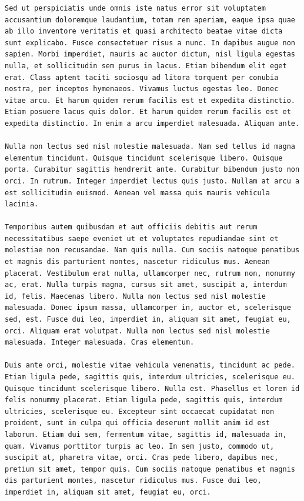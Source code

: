 \documentclass[a4paper, 12pt]{article}
\begin{document}
\begin{verbatim}
Sed ut perspiciatis unde omnis iste natus error sit voluptatem accusantium doloremque laudantium, totam rem aperiam, eaque ipsa quae ab illo inventore veritatis et quasi architecto beatae vitae dicta sunt explicabo. Fusce consectetuer risus a nunc. In dapibus augue non sapien. Morbi imperdiet, mauris ac auctor dictum, nisl ligula egestas nulla, et sollicitudin sem purus in lacus. Etiam bibendum elit eget erat. Class aptent taciti sociosqu ad litora torquent per conubia nostra, per inceptos hymenaeos. Vivamus luctus egestas leo. Donec vitae arcu. Et harum quidem rerum facilis est et expedita distinctio. Etiam posuere lacus quis dolor. Et harum quidem rerum facilis est et expedita distinctio. In enim a arcu imperdiet malesuada. Aliquam ante.

Nulla non lectus sed nisl molestie malesuada. Nam sed tellus id magna elementum tincidunt. Quisque tincidunt scelerisque libero. Quisque porta. Curabitur sagittis hendrerit ante. Curabitur bibendum justo non orci. In rutrum. Integer imperdiet lectus quis justo. Nullam at arcu a est sollicitudin euismod. Aenean vel massa quis mauris vehicula lacinia.

Temporibus autem quibusdam et aut officiis debitis aut rerum necessitatibus saepe eveniet ut et voluptates repudiandae sint et molestiae non recusandae. Nam quis nulla. Cum sociis natoque penatibus et magnis dis parturient montes, nascetur ridiculus mus. Aenean placerat. Vestibulum erat nulla, ullamcorper nec, rutrum non, nonummy ac, erat. Nulla turpis magna, cursus sit amet, suscipit a, interdum id, felis. Maecenas libero. Nulla non lectus sed nisl molestie malesuada. Donec ipsum massa, ullamcorper in, auctor et, scelerisque sed, est. Fusce dui leo, imperdiet in, aliquam sit amet, feugiat eu, orci. Aliquam erat volutpat. Nulla non lectus sed nisl molestie malesuada. Integer malesuada. Cras elementum.

Duis ante orci, molestie vitae vehicula venenatis, tincidunt ac pede. Etiam ligula pede, sagittis quis, interdum ultricies, scelerisque eu. Quisque tincidunt scelerisque libero. Nulla est. Phasellus et lorem id felis nonummy placerat. Etiam ligula pede, sagittis quis, interdum ultricies, scelerisque eu. Excepteur sint occaecat cupidatat non proident, sunt in culpa qui officia deserunt mollit anim id est laborum. Etiam dui sem, fermentum vitae, sagittis id, malesuada in, quam. Vivamus porttitor turpis ac leo. In sem justo, commodo ut, suscipit at, pharetra vitae, orci. Cras pede libero, dapibus nec, pretium sit amet, tempor quis. Cum sociis natoque penatibus et magnis dis parturient montes, nascetur ridiculus mus. Fusce dui leo, imperdiet in, aliquam sit amet, feugiat eu, orci.


\end{verbatim}
\end{document}

